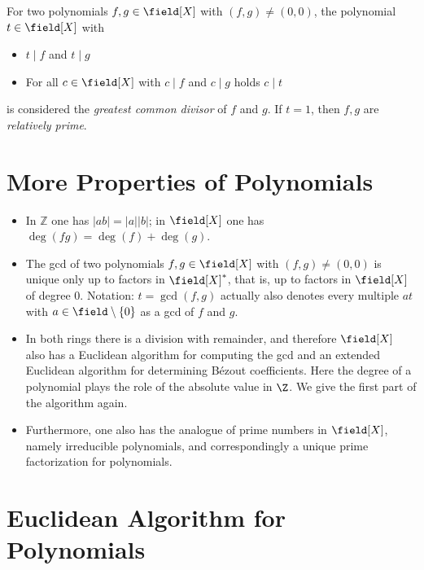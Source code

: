 For two polynomials \(f,g \in \field[X]\) with \((f,g) \ne (0,0)\), the polynomial \(t \in \field[X]\) with 

\begin{itemize}

    \item \(t \mid f\) and \(t \mid g\)

    \item For all \(c \in \field[X]\) with \(c \mid f\) and \(c \mid g\) holds \(c \mid t\)

\end{itemize}

is considered the \emph{greatest common divisor} of \(f\) and \(g\). If \(t = 1\),  then \(f,g\) are \emph{relatively prime}.

\section{More Properties of Polynomials}

\begin{itemize}

    \item In \(\mathbb{Z}\) one has \(|ab| = |a||b|\); in \(\field[X]\) one has 
    \(\deg(fg) = \deg(f) + \deg(g)\).

    \item The gcd of two polynomials \(f, g \in \field[X]\) with \((f,g) \neq (0,0)\) is unique only up to factors in \(\field[X]^{\ast}\), 
    that is, up to factors in \(\field[X]\) of degree \(0\). Notation: \(t = \gcd(f,g)\) actually also denotes every multiple \(a t\) with 
    \(a \in \field \setminus \{0\}\) as a gcd of \(f\) and \(g\).

    \item In both rings there is a division with remainder, and therefore \(\field[X]\) also has a Euclidean algorithm for computing 
    the gcd and an extended Euclidean algorithm for determining Bézout coefficients. Here the degree of a polynomial plays the role of the 
    absolute value in \(\Z\). We give the first part of the algorithm again.

    \item Furthermore, one also has the analogue of prime numbers in \(\field[X]\), namely irreducible polynomials, and correspondingly a unique prime 
    factorization for polynomials.

\end{itemize}

\section{Euclidean Algorithm for Polynomials}

